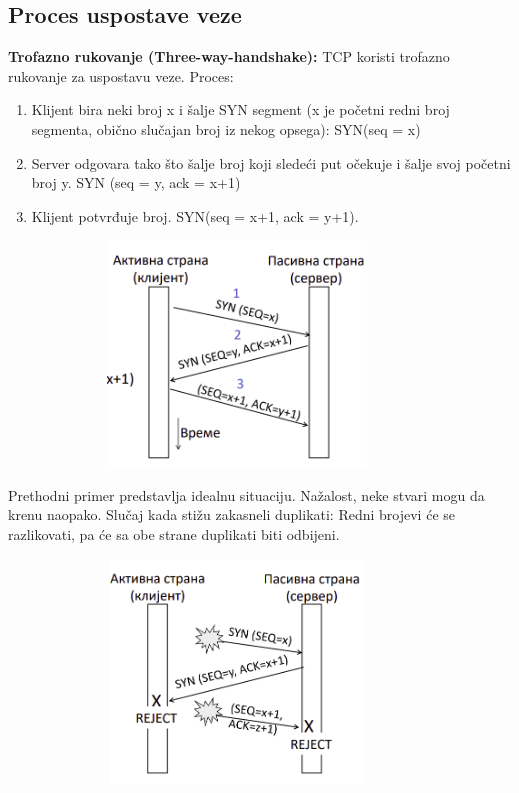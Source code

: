 \documentclass[a4paper]{article}
\begin{document}
    \subsection{Proces uspostave veze}
        \textbf{Trofazno rukovanje (Three-way-handshake):} TCP koristi trofazno rukovanje za 
        uspostavu veze. Proces:
        \begin{enumerate}
            \item Klijent bira neki broj x i šalje SYN segment (x je početni redni 
                  broj segmenta, obično slučajan broj iz nekog opsega): SYN(seq = x)
            \item Server odgovara tako što šalje broj koji sledeći put očekuje i šalje 
                  svoj početni broj y. SYN (seq = y, ack = x+1)
            \item Klijent potvrđuje broj. SYN(seq = x+1, ack = y+1).
        \end{enumerate}
        \begin{figure}[H]
            \begin{center}
                \includegraphics[width=100mm,height=60mm]{Slike/uspostava_konekcije1.png}
            \end{center}
        \end{figure}
        
        Prethodni primer predstavlja idealnu situaciju. Nažalost, neke stvari mogu da krenu naopako.
        Slučaj kada stižu zakasneli duplikati: Redni brojevi će se razlikovati, pa će sa obe strane
        duplikati biti odbijeni.
        \begin{figure}[H]
            \begin{center}
                \includegraphics[width=100mm,height=60mm]{Slike/uspostava_konekcije2.png}
            \end{center}
        \end{figure}
\end{document}
